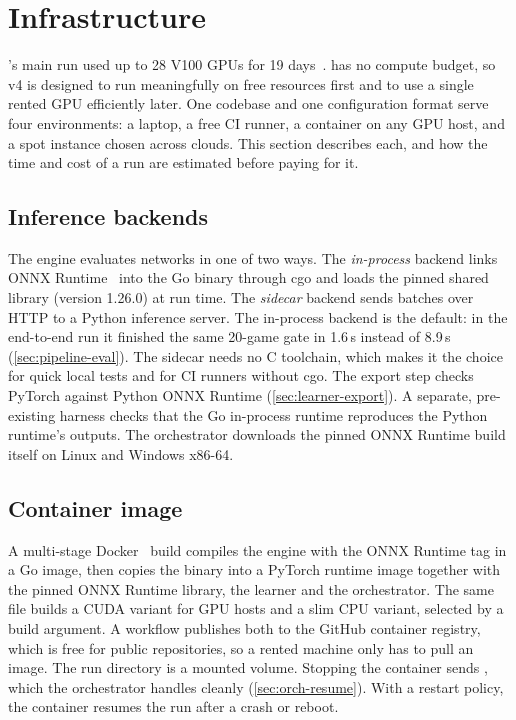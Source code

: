 \section{Infrastructure}
\label{sec:infra}

\katago{}'s main run used up to 28 V100 GPUs for 19 days~\citep[App.~C]{wu2019accelerating}.
\gofer{} has no compute budget, so v4 is designed to run meaningfully on free resources
first and to use a single rented GPU efficiently later. One codebase and one configuration
format serve four environments: a laptop, a free CI runner, a container on any GPU host,
and a spot instance chosen across clouds. This section describes each, and how the time
and cost of a run are estimated before paying for it.

\subsection{Inference backends}
\label{sec:infra-backends}

The engine evaluates networks in one of two ways. The \emph{in-process} backend links ONNX
Runtime~\citep{onnxruntime2021} into the Go binary through cgo and loads the pinned
shared library (version 1.26.0) at run time. The \emph{sidecar} backend sends batches over
HTTP to a Python inference server. The in-process backend is the default: in the
end-to-end run it finished the same 20-game gate in 1.6\,s instead of 8.9\,s
(\cref{sec:pipeline-eval}). The sidecar needs no C toolchain, which makes it the choice for
quick local tests and for CI runners without cgo. The export step checks PyTorch against
Python ONNX Runtime (\cref{sec:learner-export}). A separate, pre-existing harness checks
that the Go in-process runtime reproduces the Python runtime's outputs. The orchestrator
downloads the pinned ONNX Runtime build itself on Linux and Windows x86-64.

\subsection{Container image}
\label{sec:infra-docker}

A multi-stage Docker~\citep{merkel2014docker} build compiles the engine with the ONNX
Runtime tag in a Go image, then copies the binary into a PyTorch runtime image together
with the pinned ONNX Runtime library, the learner and the orchestrator. The same file
builds a CUDA variant for GPU hosts and a slim CPU variant, selected by a build argument.
A workflow publishes both to the GitHub container registry, which is free for public
repositories, so a rented machine only has to pull an image. The run directory is a
mounted volume. Stopping the container sends , which the orchestrator handles
cleanly (\cref{sec:orch-resume}). With a restart policy, the container resumes the run
after a crash or reboot.


